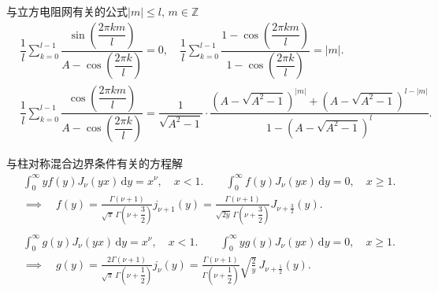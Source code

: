 与立方电阻网有关的公式\(|m| \leq l,\,m \in \mathbb{Z}\)
\begin{align*}
	&\dfrac{1}{l} \sum_{k=0}^{l-1} \dfrac{\sin\left( \dfrac{2\pi k m}{l} \right)}{A - \cos\left( \dfrac{2\pi k}{l} \right)} = 0,\quad \dfrac{1}{l} \sum_{k=0}^{l-1} \dfrac{1 - \cos\left( \dfrac{2\pi k m}{l} \right)}{1 - \cos\left( \dfrac{2\pi k}{l} \right)} = |m|.\\
	&\dfrac{1}{l} \sum_{k=0}^{l-1} \dfrac{\cos\left( \dfrac{2\pi k m}{l} \right)}{A - \cos\left( \dfrac{2\pi k}{l} \right)} = \dfrac{1}{\sqrt{A^2 - 1}} \cdot \dfrac{(A - \sqrt{A^2 - 1})^{|m|} + (A - \sqrt{A^2 - 1})^{l - |m|}}{1 - (A - \sqrt{A^2 - 1})^l}.
\end{align*}

与柱对称混合边界条件有关的方程解
\begin{align*}
&\int_0^\infty y f(y) J_\nu(yx) \,\mathrm{d}y = x^\nu, \quad x < 1. \qquad
\int_0^\infty f(y) J_\nu(yx) \,\mathrm{d}y = 0, \quad x \ge 1.\\
&\implies\quad f(y) = \frac{\Gamma(\nu+1)}{\sqrt{\pi}\,\Gamma\left(\nu+\dfrac{3}{2}\right)} j_{\nu+1}(y) = \frac{\Gamma(\nu+1)}{\sqrt{2y}\,\Gamma\left(\nu+\dfrac{3}{2}\right)} J_{\nu+\frac{3}{2}}(y).\\
\\
&\int_0^\infty g(y) J_\nu(yx) \,\mathrm{d}y = x^\nu, \quad x < 1. \qquad
\int_0^\infty y g(y) J_\nu(yx) \,\mathrm{d}y = 0, \quad x \ge 1.\\
&\implies\quad g(y) = \frac{2\Gamma(\nu+1)}{\sqrt{\pi}\,\Gamma\left(\nu+\dfrac{1}{2}\right)} j_{\nu}(y) = \frac{\Gamma(\nu+1)}{\Gamma\left(\nu+\dfrac{1}{2}\right)}\sqrt{\frac{2}{y}}\,J_{\nu+\frac{1}{2}}(y).
\end{align*}


